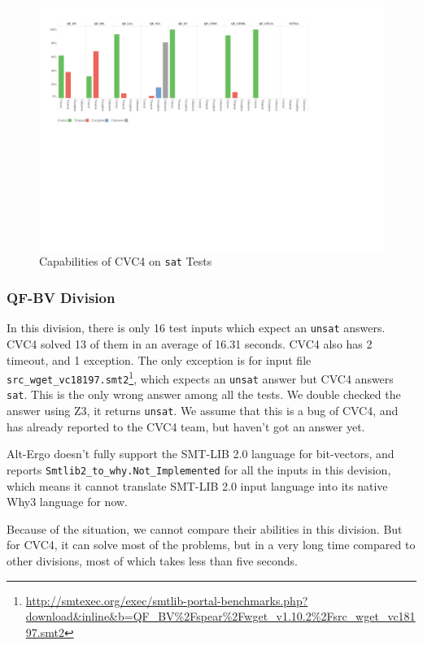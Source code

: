 \documentclass[10pt,letter]{article}
\theoremstyle{definition}
\begin{document}
\begin{figure}
\centering
\includegraphics[scale=0.45]{./testanalysis/satcap.pdf}
\caption{Capabilities of CVC4 on {\tt sat} Tests}
\label{f:satcap}
\end{figure}

\subsubsection{QF-BV Division}

In this division, there is only 16 test inputs which expect an {\tt unsat} answers. CVC4 solved 13 of them in an average of 16.31 seconds. CVC4 also has 2 timeout, and 1 exception. The only exception is for input file {\tt src_wget_vc18197.smt2}\footnote{\url{http://smtexec.org/exec/smtlib-portal-benchmarks.php?download&inline&b=QF_BV\%2Fspear\%2Fwget_v1.10.2\%2Fsrc_wget_vc18197.smt2}}, which expects an {\tt unsat} answer but CVC4 answers {\tt sat}. This is the only wrong answer among all the tests. We double checked the answer using Z3\cite{de2008z3}, it returns {\tt unsat}. We assume that this is a bug of CVC4, and has already reported to the CVC4 team, but haven't got an answer yet.

Alt-Ergo doesn't fully support the SMT-LIB 2.0 language for bit-vectors, and reports {\tt Smtlib2_to_why.Not_Implemented} for all the inputs in this devision, which means it cannot translate SMT-LIB 2.0 input language into its native Why3 language\cite{bobot:why3:2011} for now. 

Because of the situation, we cannot compare their abilities in this division. But for CVC4, it can solve most of the problems, but in a very long time compared to other divisions, most of which takes less than five seconds.
\end{document}
